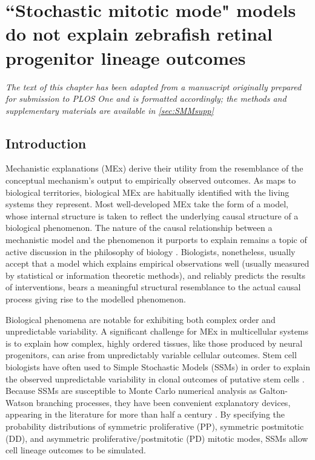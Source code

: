 \chapter{``Stochastic mitotic mode" models do not explain zebrafish retinal progenitor lineage outcomes}
\label{chap:SMME}
\textit{The text of this chapter has been adapted from a manuscript originally prepared for submission to PLOS One and is formatted accordingly; the methods and supplementary materials are available in \autoref{sec:SMMsupp}}

\section{Introduction}

Mechanistic explanations (MEx) derive their utility from the resemblance of the conceptual mechanism's output to empirically observed outcomes. As maps to biological territories, biological MEx are habitually identified with the living systems they represent. Most well-developed MEx take the form of a model, whose internal structure is taken to reflect the underlying causal structure of a biological phenomenon. The nature of the causal relationship between a mechanistic model and the phenomenon it purports to explain remains a topic of active discussion in the philosophy of biology \cite{Fagan2015}. Biologists, nonetheless, usually accept that a model which explains empirical observations well (usually measured by statistical or information theoretic methods), and reliably predicts the results of interventions, bears a meaningful structural resemblance to the actual causal process giving rise to the modelled phenomenon.

Biological phenomena are notable for exhibiting both complex order and unpredictable variability. A significant challenge for MEx in multicellular systems is to explain how complex, highly ordered tissues, like those produced by neural progenitors, can arise from unpredictably variable cellular outcomes. Stem cell biologists have often used to Simple Stochastic Models (SSMs) in order to explain the observed unpredictable variability in clonal outcomes of putative stem cells \cite{Fagan2013}. Because SSMs are susceptible to Monte Carlo numerical analysis as Galton-Watson branching processes, they have been convenient explanatory devices, appearing in the literature for more than half a century \cite{Till1964}. By specifying the probability distributions of symmetric proliferative (PP), symmetric postmitotic (DD), and asymmetric proliferative/postmitotic (PD) mitotic modes, SSMs allow cell lineage outcomes to be simulated.

